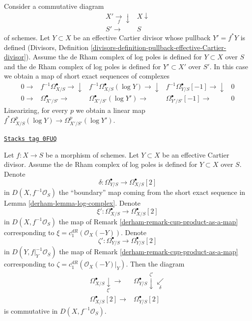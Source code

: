 Consider a commutative diagram
$$
\begin{array}{cc}X' \underset{f}{\longrightarrow}\downarrow & X \downarrow \\ S' \longrightarrow & S\end{array}
$$
of schemes. Let $Y \subset X$ be an effective Cartier divisor
whose pullback $Y' = f^*Y$ is defined
(Divisors, Definition
\ref{divisors-definition-pullback-effective-Cartier-divisor}).
Assume
the de Rham complex of log poles is defined for $Y \subset X$ over $S$
and
the de Rham complex of log poles is defined for $Y' \subset X'$ over $S'$.
In this case we obtain a map of short exact sequences of complexes
$$
\begin{array}{ccccc}0 \longrightarrow & f^{-1}\Omega^\bullet_{X/S} \longrightarrow\downarrow & f^{-1}\Omega^\bullet_{X/S}(\log Y) \longrightarrow\downarrow & f^{-1}\Omega^\bullet_{Y/S}[-1] \longrightarrow\downarrow & 0 \\ 0 \longrightarrow & \Omega^\bullet_{X'/S'} \longrightarrow & \Omega^\bullet_{X'/S'}(\log Y') \longrightarrow & \Omega^\bullet_{Y'/S'}[-1] \longrightarrow & 0\end{array}
$$
Linearizing, for every $p$ we obtain a linear map
$f^*\Omega^p_{X/S}(\log Y) \to \Omega^p_{X'/S'}(\log Y')$.

\begin{lemma}
\label{derham-lemma-gysin-via-log-complex}
\href{https://stacks.math.columbia.edu/tag/0FUQ}{\texttt{Stacks tag 0FUQ}}

Let $f : X \to S$ be a morphism of schemes. Let $Y \subset X$ be an effective
Cartier divisor. Assume the de Rham complex of log poles is defined for
$Y \subset X$ over $S$. Denote
$$
\delta : \Omega^\bullet_{Y/S} \to \Omega^\bullet_{X/S}[2]
$$
in $D(X, f^{-1}\mathcal{O}_S)$ the ``boundary'' map coming from the
short exact sequence in Lemma \ref{derham-lemma-log-complex}. Denote
$$
\xi' : \Omega^\bullet_{X/S} \to \Omega^\bullet_{X/S}[2]
$$
in $D(X, f^{-1}\mathcal{O}_S)$ the map of
Remark \ref{derham-remark-cup-product-as-a-map}
corresponding to $\xi = c_1^{dR}(\mathcal{O}_X(-Y))$. Denote
$$
\zeta' : \Omega^\bullet_{Y/S} \to \Omega^\bullet_{Y/S}[2]
$$
in $D(Y, f|_Y^{-1}\mathcal{O}_S)$ the map of
Remark \ref{derham-remark-cup-product-as-a-map} corresponding to
$\zeta = c_1^{dR}(\mathcal{O}_X(-Y)|_Y)$. Then the diagram
$$
\begin{array}{cc}\Omega^\bullet_{X/S} \underset{\xi'}{\downarrow}\longrightarrow & \Omega^\bullet_{Y/S} \overset{\zeta'}{\downarrow}\underset{\delta}{\swarrow} \\ \Omega^\bullet_{X/S}[2] \longrightarrow & \Omega^\bullet_{Y/S}[2]\end{array}
$$
is commutative in $D(X, f^{-1}\mathcal{O}_S)$.
\end{lemma}


